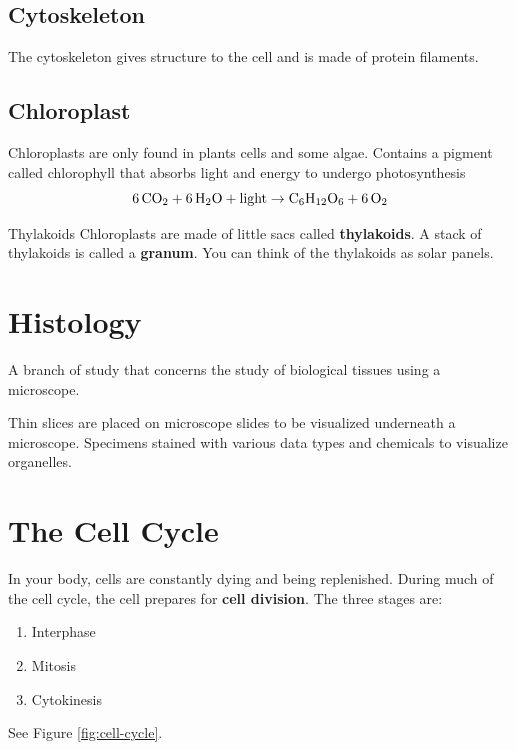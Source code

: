 \documentclass[12pt]{report}
\begin{document}
\subsection{Cytoskeleton}
\begin{definition}[Cytoskeleton]
    The cytoskeleton gives structure to the cell and is made of protein filaments.
\end{definition}

\subsection{Chloroplast}
\begin{definition}[Chloroplast]
    Chloroplasts are only found in plants cells and some algae. Contains a pigment called chlorophyll that absorbs light and energy to undergo photosynthesis 
    \[
        \ce{6CO2}+ \ce{6H2O}+ \text{light}\to \ce{C6H12O6}+ \ce{6O2}
    \]
\end{definition}

\begin{note}{Thylakoids}
Chloroplasts are made of little sacs called \textbf{thylakoids}. A stack of thylakoids is called a \textbf{granum}. You can think of the thylakoids as solar panels.
\end{note}

\section{Histology}
\begin{definition}[Histology]
    A branch of study that concerns the study of biological tissues using a microscope.
\end{definition}

Thin slices are placed on microscope slides to be visualized underneath a microscope. Specimens stained with various data types and chemicals to visualize organelles. 

\section{The Cell Cycle}
\begin{definition}
In your body, cells are constantly dying and being replenished. During much of the cell cycle, the cell prepares for \textbf{cell division}. The three stages are: 
\begin{enumerate}
\setlength\itemsep{0.5em}
    \item{Interphase}
    \item{Mitosis}
    \item{Cytokinesis}
\end{enumerate}
See Figure \ref{fig:cell-cycle}.
\end{definition}
\end{document}
